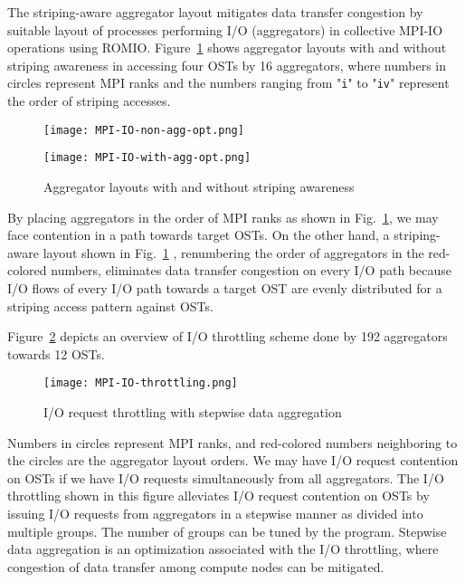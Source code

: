 \documentclass{jhps}
\begin{document}
The striping-aware aggregator layout mitigates data transfer congestion
by suitable layout of processes performing I/O (aggregators)
in collective MPI-IO operations using ROMIO.
Figure~\ref{fig:AGG_STR_AWARE} shows aggregator layouts with and
without striping awareness in accessing four OSTs by 16 aggregators,
where numbers in circles represent MPI ranks
and the numbers ranging from "{\tt i}" to "{\tt iv}" represent
the order of striping accesses.
%
\begin{figure}[htb]
\centering
\begin{minipage}[t]{0.42\textwidth}
\centering
\texttt{[image: MPI-IO-non-agg-opt.png]}
\label{fig:WO_STR_AWARE}
\end{minipage}
\noindent
\begin{minipage}[t]{0.42\textwidth}
\centering
\texttt{[image: MPI-IO-with-agg-opt.png]}
\label{fig:WITH_STR_AWARE}
\end{minipage}
\caption{Aggregator layouts with and without striping awareness}
\label{fig:AGG_STR_AWARE}
\end{figure}
%
By placing aggregators in the order of MPI ranks
as shown in Fig.~\ref{fig:AGG_STR_AWARE},
we may face contention in a path towards target OSTs.
On the other hand, a striping-aware layout shown in
Fig.~\ref{fig:AGG_STR_AWARE} ,
renumbering the order of aggregators in the red-colored numbers,
eliminates data transfer congestion on every I/O path
because I/O flows of every I/O path towards a target OST are
evenly distributed for a striping access pattern against OSTs.

Figure~\ref{fig:IO_THROT} depicts an overview of I/O throttling
scheme done by 192 aggregators towards 12 OSTs.
%
\begin{figure}[htb]
\centering
\texttt{[image: MPI-IO-throttling.png]}
\caption{I/O request throttling with stepwise data aggregation}
\label{fig:IO_THROT}
\end{figure}
%
Numbers in circles represent MPI ranks, and red-colored numbers neighboring
to the circles are the aggregator layout orders.
We may have I/O request contention on OSTs
if we have I/O requests simultaneously from all aggregators.
The I/O throttling shown in this figure alleviates I/O request contention
on OSTs by issuing I/O requests from aggregators in a stepwise manner
as divided into multiple groups.
The number of groups can be tuned by the program.
Stepwise data aggregation is an optimization associated
with the I/O throttling, where congestion of data transfer
among compute nodes can be mitigated.
\end{document}
